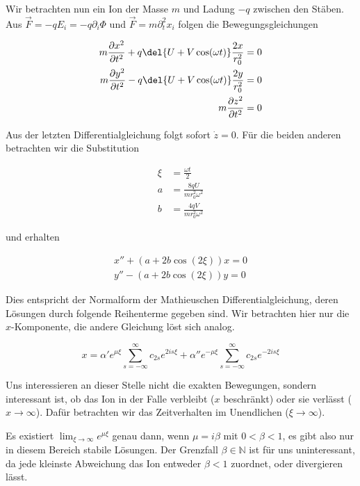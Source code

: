\documentclass[a4paper,german,12pt,smallheadings]{scrartcl}
\begin{document}
Wir betrachten nun ein Ion der Masse $m$ und Ladung $-q$ zwischen den Stäben.
Aus $\vec{F} = -q E_i = -q \partial_i \Phi$ und $\vec{F} = m \partial_t^2 x_i$
folgen die Bewegungsgleichungen

\begin{align}
  m \frac{\partial x^2}{\partial t^2} + q \del{U + V \cos(\omega t)} \frac{2 x}{r_0^2} &= 0 \\
  m \frac{\partial y^2}{\partial t^2} - q \del{U + V \cos(\omega t)} \frac{2 y}{r_0^2} &= 0 \\
  m \frac{\partial z^2}{\partial t^2} &= 0
\end{align}

Aus der letzten Differentialgleichung folgt sofort $\dot z=0$. Für die beiden anderen
betrachten wir die Substitution

\begin{align}
  \xi &=\frac{\omega t}{2} \\
  a &= \frac{8qU}{m r_0^2 \omega^2} \\
  b &= \frac{4qV}{m r_0^2 \omega^2}
\end{align}

und erhalten

\begin{align}
  x'' + (a + 2 b \cos(2 \xi)) x = 0 \\
  y'' - (a + 2 b \cos(2 \xi)) y = 0
\end{align}

Dies entspricht der Normalform der Mathieuschen Differentialgleichung, deren
Lösungen durch folgende Reihenterme gegeben sind. Wir betrachten hier nur die
$x$-Komponente, die andere Gleichung löst sich analog.

\begin{equation}
  x = \alpha' e^{\mu \xi} \sum_{s=-\infty}^{\infty} c_{2s} e^{2is \xi} + \alpha'' e^{-\mu \xi} \sum_{s=-\infty}^{\infty} c_{2s} e^{-2is \xi}
\end{equation}

Uns interessieren an dieser Stelle nicht die exakten Bewegungen, sondern
interessant ist, ob das Ion in der Falle verbleibt ($x$ beschränkt) oder sie
verlässt ($x \to \infty$). Dafür betrachten wir das Zeitverhalten im
Unendlichen ($\xi \to \infty$).

Es existiert $\lim_{\xi \to \infty} e^{\mu \xi}$ genau dann, wenn $\mu = i
\beta$ mit $0 < \beta < 1$, es gibt also nur in diesem Bereich stabile
Lösungen. Der Grenzfall $\beta \in \mathbb{N}$ ist für uns uninteressant, da
jede kleinste Abweichung das Ion entweder $\beta < 1$ zuordnet, oder
divergieren lässt.
\end{document}
